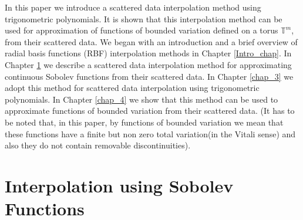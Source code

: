 \documentclass[multixcb]{amstext-l}
\theoremstyle{plain}
\theoremstyle{definition}
\theoremstyle{definition}
\theoremstyle{remark}
\numberwithin{equation}{chapter}
\begin{document}
In this paper we introduce a scattered data interpolation method using trigonometric polynomials. It is shown that this interpolation method can be used for approximation of functions of bounded variation defined on a torus $\mathbb{T}^m$, from their scattered data. We began with an introduction and a brief overview of radial basis functions (RBF) interpolation methods in Chapter \ref{Intro_chap}. In Chapter \ref{chap_2} we describe a scattered data interpolation method for approximating continuous Sobolev functions from their scattered data. In Chapter \ref{chap_3} we adopt this method for scattered data interpolation using trigonometric polynomials. In Chapter \ref{chap_4} we show that this method can be used to approximate functions of bounded variation from their scattered data. (It has to be noted that, in this paper, by functions of bounded variation we mean that these functions have  a finite but non zero total variation(in the Vitali sense) and also they do not contain removable discontinuities).



\chapter{Interpolation using Sobolev Functions}\label{chap_2}
\end{document}
